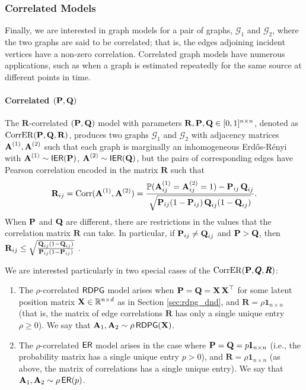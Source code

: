 \subsubsection{Correlated Models} \label{sec:correlated-graphs}
Finally, we are interested in graph models for a pair of graphs, $\mathcal{G}_1$ and $\mathcal{G}_2$, where the two graphs are said to be correlated; that is, the edges adjoining incident vertices have a non-zero correlation. Correlated graph models have numerous applications, such as when a graph is estimated repeatedly for the same source at different points in time.

\paragraph{Correlated $(\Pbf,\Q)$}

The $\mathbf{R}$-correlated $(\Pbf, \Q)$ model \cite{lyzinski2017matchability} with parameters $\mathbf{R}, \Pbf, \Q\in[0,1]^{n\times n}$, denoted as $\mathrm{CorrER}(\Pbf, \Q, \mathbf{R})$, produces two graphs $\mathcal{G}_1$ and $\mathcal{G}_2$ with adjacency matrices $\A^{(1)}, \A^{(2)}$ such that each graph is marginally an inhomogeneous Erd\H{o}s-R\'enyi with $\A^{(1)} \sim \ier(\Pbf)$, $\A^{(2)}\sim \ier(\Q)$, but the  pairs of corresponding edges have Pearson correlation  encoded in the matrix $\mathbf{R}$ such that 
$$\mathbf{R}_{ij} = \text{Corr}(\A^{(1)}, \A^{(2)})= \frac{\mathbb{P}(\A^{(1)}_{ij}=\A^{(2)}_{ij}=1)-\Pbf_{ij}\Q_{ij}}{\sqrt{\Pbf_{ij}(1-\Pbf_{ij}) \Q_{ij}(1-\Q_{ij})}}.$$
When $\Pbf$ and $\Q$ are different, there are restrictions in the values that the correlation matrix $\mathbf{R}$ can take. In particular, if $\Pbf_{ij}\neq\Q_{ij}$  and $\Pbf>\Q$, then $\mathbf{R}_{ij}\leq \sqrt{\frac{\Q_{ij}(1-\Q_{ij})}{\Pbf_{ij}(1-\Pbf_{ij})}}$ \cite{lyzinski2017matchability}.

We are interested particularly in two special cases of the $\mathrm{CorrER}(\Pbf, \pmb Q, \pmb R)$:
\begin{enumerate}
    \item The $\rho$-correlated $\rdpg$ model arises when $\Pbf = \Q=\X\X^\top$ for some latent position matrix $\X \in \RR^{n \times d}$  as in Section \ref{sec:rdpg_dnd}, and $\pmb R = \rho \pmb 1_{n \times n}$ (that is, the matrix of edge correlations $\pmb R$ has only a single unique entry $\rho\geq 0$). We say that $\A_1, \A_2 \sim \rho\rdpg(\X)$.
    \item The $\rho$-correlated $\er$ model arises in the case where $\Pbf = \Q = p\pmb 1_{n \times n}$ (i.e.,  the probability matrix has a single unique entry $p>0$), and $\pmb R = \rho\pmb 1_{n \times n}$ (as above, the matrix of correlations has a single unique entry). We say that $\A_1, \A_2 \sim \rho\er(p)$.
\end{enumerate}